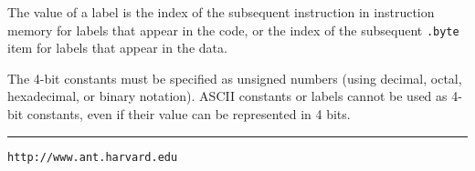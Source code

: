 \documentclass[10pt]{report}
\begin{document}
\begin{description}
The value of a label is the index of the subsequent instruction in
instruction memory for labels that appear in the code, or the index of
the subsequent {\tt .byte} item for labels that appear in the data.

The 4-bit constants must be specified as unsigned numbers (using
decimal, octal, hexadecimal, or binary notation).  ASCII constants or
labels cannot be used as 4-bit constants, even if their value can be
represented in 4 bits.

\end{description}

\hrule
\begin{center}
{\Large
{\tt http://www.ant.harvard.edu}
}
\end{center}
\end{document}
